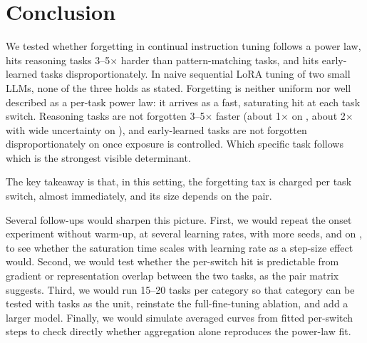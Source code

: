 \section{Conclusion}
\label{sec:conclusion}

We tested whether forgetting in continual instruction tuning follows a power law, hits reasoning tasks 3--5$\times$ harder than pattern-matching tasks, and hits early-learned tasks disproportionately.
In naive sequential LoRA tuning of two small LLMs, none of the three holds as stated.
Forgetting is neither uniform nor well described as a per-task power law: it arrives as a fast, saturating hit at each task switch.
Reasoning tasks are not forgotten 3--5$\times$ faster (about 1$\times$ on \llama, about 2$\times$ with wide uncertainty on \qwen), and early-learned tasks are not forgotten disproportionately on \llama once exposure is controlled.
Which specific task follows which is the strongest visible determinant.

The key takeaway is that, in this setting, the forgetting tax is charged per task switch, almost immediately, and its size depends on the pair.

Several follow-ups would sharpen this picture.
First, we would repeat the onset experiment without warm-up, at several learning rates, with more seeds, and on \qwen, to see whether the saturation time scales with learning rate as a step-size effect would.
Second, we would test whether the per-switch hit is predictable from gradient or representation overlap between the two tasks, as the pair matrix suggests.
Third, we would run 15--20 tasks per category so that category can be tested with tasks as the unit, reinstate the full-fine-tuning ablation, and add a larger model.
Finally, we would simulate averaged curves from fitted per-switch steps to check directly whether aggregation alone reproduces the power-law fit.
